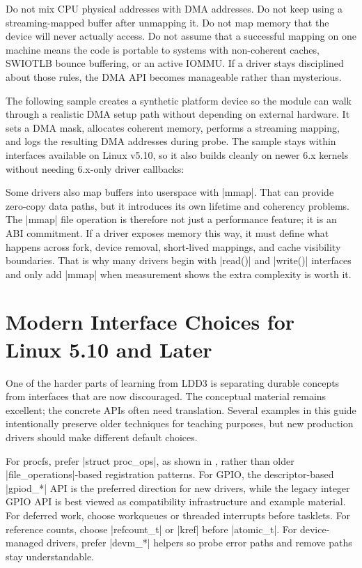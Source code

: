 \documentclass[10pt, oneside]{book}
\begin{document}
Do not mix CPU physical addresses with DMA addresses.
Do not keep using a streaming-mapped buffer after unmapping it.
Do not map memory that the device will never actually access.
Do not assume that a successful mapping on one machine means the code is
portable to systems with non-coherent caches, SWIOTLB bounce buffering, or an
active IOMMU.
If a driver stays disciplined about those rules, the DMA API becomes manageable
rather than mysterious.

The following sample creates a synthetic platform device so the module can walk
through a realistic DMA setup path without depending on external hardware.
It sets a DMA mask, allocates coherent memory, performs a streaming mapping,
and logs the resulting DMA addresses during probe.
The sample stays within interfaces available on Linux v5.10, so it also builds
cleanly on newer 6.x kernels without needing 6.x-only driver callbacks:


Some drivers also map buffers into userspace with \cpp|mmap|.
That can provide zero-copy data paths, but it introduces its own lifetime and
coherency problems.
The \cpp|mmap| file operation is therefore not just a performance feature; it is
an ABI commitment.
If a driver exposes memory this way, it must define what happens across fork,
device removal, short-lived mappings, and cache visibility boundaries.
That is why many drivers begin with \cpp|read()| and \cpp|write()| interfaces
and only add \cpp|mmap| when measurement shows the extra complexity is worth it.

\section{Modern Interface Choices for Linux 5.10 and Later}
\label{sec:modern_interfaces}
One of the harder parts of learning from LDD3 is separating durable concepts
from interfaces that are now discouraged.
The conceptual material remains excellent; the concrete APIs often need
translation.
Several examples in this guide intentionally preserve older techniques for
teaching purposes, but new production drivers should make different default
choices.

For procfs, prefer \cpp|struct proc_ops|, as shown in
, rather than older \cpp|file_operations|-based
registration patterns.
For GPIO, the descriptor-based \cpp|gpiod_*| API is the preferred direction for
new drivers, while the legacy integer GPIO API is best viewed as compatibility
infrastructure and example material.
For deferred work, choose workqueues or threaded interrupts before tasklets.
For reference counts, choose \cpp|refcount_t| or \cpp|kref| before \cpp|atomic_t|.
For device-managed drivers, prefer \cpp|devm_*| helpers so probe error paths and
remove paths stay understandable.
\end{document}
